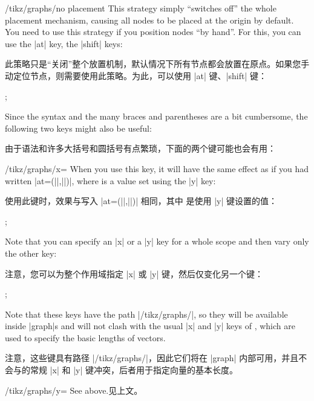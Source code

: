 \begin{key}{/tikz/graphs/no placement}
    This strategy simply ``switches off'' the whole placement mechanism,
    causing all nodes to be placed at the origin by default. You need to use
    this strategy if you position nodes ``by hand''. For this, you can use the
    |at| key, the |shift| keys:
    
    此策略只是``关闭''整个放置机制，默认情况下所有节点都会放置在原点。如果您手动定位节点，则需要使用此策略。为此，可以使用 |at| 键、|shift| 键：
\begin{codeexample}[preamble={\usetikzlibrary{graphs}}]
\tikz {};
\end{codeexample}
    Since the syntax and the many braces and parentheses are a bit cumbersome,
    the following two keys might also be useful:
    
    由于语法和许多大括号和圆括号有点繁琐，下面的两个键可能也会有用：

    \begin{key}{/tikz/graphs/x=}
        When you use this key, it will have the same effect as if you had
        written |at={(||,||)}|, where
         is a value set using the |y| key:
        
        使用此键时，效果与写入 |at={(||,||)}| 相同，其中  是使用 |y| 键设置的值：
\begin{codeexample}[preamble={\usetikzlibrary{graphs}}]
\tikz {};
\end{codeexample}
        Note that you can specify an |x| or a |y| key for a whole scope and
        then vary only the other key:
        
        注意，您可以为整个作用域指定 |x| 或 |y| 键，然后仅变化另一个键：
\begin{codeexample}[preamble={\usetikzlibrary{graphs}}]
\tikz {};
\end{codeexample}
        Note that these keys have the path |/tikz/graphs/|, so they will be
        available inside |graph|s and will not clash with the usual |x| and |y|
        keys of \tikzname, which are used to specify the basic lengths of
        vectors.

        注意，这些键具有路径 |/tikz/graphs/|，因此它们将在 |graph| 内部可用，并且不会与\tikzname 的常规 |x| 和 |y| 键冲突，后者用于指定向量的基本长度。
    \end{key}
    \begin{key}{/tikz/graphs/y=}
        See above.见上文。
    \end{key}
\end{key}


